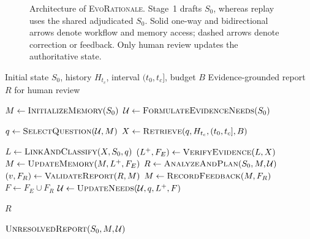 \documentclass[10pt,conference]{IEEEtran}
\begin{document}
\begin{figure}[!t]
{
}%

\caption{Architecture of \textsc{EvoRationale}. Stage~1 drafts $S_0$, whereas replay uses the shared adjudicated $S_0$. Solid one-way and bidirectional arrows denote workflow and memory access; dashed arrows denote correction or feedback. Only human review updates the authoritative state.}
\label{fig:evorationale-overview}
\end{figure}

\begin{algorithm}[!t]
\caption{Bounded post-decision revalidation}
\label{alg:revalidation-loop}
\begin{algorithmic}[1]
\REQUIRE Initial state $S_0$, history $H_{t_c}$, interval $(t_0,t_c]$, budget $B$
\ENSURE Evidence-grounded report $R$ for human review

\STATE $M \leftarrow \textsc{InitializeMemory}(S_0)$
\STATE $\mathcal{U} \leftarrow \textsc{FormulateEvidenceNeeds}(S_0)$

\STATE $q \leftarrow \textsc{SelectQuestion}(\mathcal{U},M)$
\STATE $X \leftarrow \textsc{Retrieve}(q,H_{t_c},(t_0,t_c],B)$

\STATE $L \leftarrow \textsc{LinkAndClassify}(X,S_0,q)$
\STATE $(L^{+},F_E) \leftarrow \textsc{VerifyEvidence}(L,X)$
\STATE $M \leftarrow \textsc{UpdateMemory}(M,L^{+},F_E)$
\STATE $R \leftarrow \textsc{AnalyzeAndPlan}(S_0,M,\mathcal{U})$
\STATE $(v,F_R) \leftarrow \textsc{ValidateReport}(R,M)$
\STATE $M \leftarrow \textsc{RecordFeedback}(M,F_R)$
\STATE $F \leftarrow F_E \cup F_R$
\STATE $\mathcal{U}\leftarrow
       \textsc{UpdateNeeds}(\mathcal{U},q,L^{+},F)$


\RETURN $R$
\ENDIF
\ENDWHILE

\RETURN $\textsc{UnresolvedReport}(S_0,M,\mathcal{U})$
\end{algorithmic}
\end{algorithm}
\end{document}
